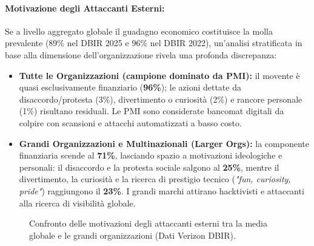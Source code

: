 \documentclass[../../main.tex]{subfiles}
\begin{document}
\paragraph{Motivazione degli Attaccanti Esterni:}
Se a livello aggregato globale il guadagno economico costituisce la molla prevalente (89\% nel DBIR 2025 e 96\% nel DBIR 2022), un'analisi stratificata in base alla dimensione dell'organizzazione rivela una profonda discrepanza:
\begin{itemize}
    \item \textbf{Tutte le Organizzazioni (campione dominato da PMI):} il movente è quasi esclusivamente finanziario (\textbf{96\%}); le azioni dettate da disaccordo/protesta (3\%), divertimento o curiosità (2\%) e rancore personale (1\%) risultano residuali. Le PMI sono considerate bancomat digitali da colpire con scansioni e attacchi automatizzati a basso costo.
    \item \textbf{Grandi Organizzazioni e Multinazionali (Larger Orgs):} la componente finanziaria scende al \textbf{71\%}, lasciando spazio a motivazioni ideologiche e personali: il disaccordo e la protesta sociale salgono al \textbf{25\%}, mentre il divertimento, la curiosità e la ricerca di prestigio tecnico (\textit{"fun, curiosity, pride"}) raggiungono il \textbf{23\%}. I grandi marchi attirano hacktivisti e attaccanti alla ricerca di visibilità globale.
\end{itemize}

\begin{figure}[htbp]
\centering
{}
\caption{Confronto delle motivazioni degli attaccanti esterni tra la media globale e le grandi organizzazioni (Dati Verizon DBIR).}
\label{fig:dbir_motives_comparison}
\end{figure}
\end{document}
